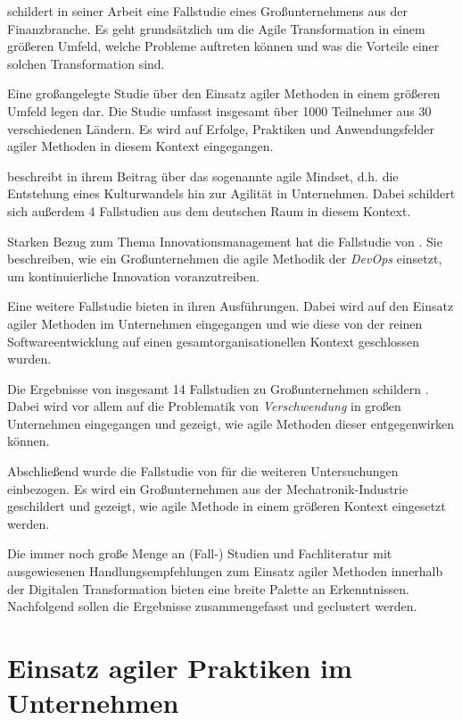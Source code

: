  schildert in seiner Arbeit eine Fallstudie eines Großunternehmens aus der Finanzbranche. Es geht grundsätzlich um die Agile Transformation in einem größeren Umfeld, welche Probleme auftreten können und was die Vorteile einer solchen Transformation sind.

Eine großangelegte Studie über den Einsatz agiler Methoden in einem größeren Umfeld legen  dar. Die Studie umfasst insgesamt über 1000 Teilnehmer aus 30 verschiedenen Ländern. Es wird auf Erfolge, Praktiken und Anwendungsfelder agiler Methoden in diesem Kontext eingegangen.

 beschreibt in ihrem Beitrag über das sogenannte agile Mindset, d.h. die Entstehung eines Kulturwandels hin zur Agilität in Unternehmen. Dabei schildert sich außerdem 4 Fallstudien aus dem deutschen Raum in diesem Kontext. 

Starken Bezug zum Thema Innovationsmanagement hat die Fallstudie von . Sie beschreiben, wie ein Großunternehmen die agile Methodik der \textit{DevOps} einsetzt, um kontinuierliche Innovation voranzutreiben.

Eine weitere Fallstudie bieten  in ihren Ausführungen. Dabei wird auf den Einsatz agiler Methoden im Unternehmen eingegangen und wie diese von der reinen Softwareentwicklung auf einen gesamtorganisationellen Kontext geschlossen wurden.

Die Ergebnisse von insgesamt 14 Fallstudien zu Großunternehmen schildern . Dabei wird vor allem auf die Problematik von \textit{Verschwendung} in großen Unternehmen eingegangen und gezeigt, wie agile Methoden dieser entgegenwirken können.

Abschließend wurde die Fallstudie von  für die weiteren Untersuchungen einbezogen. Es wird ein Großunternehmen aus der Mechatronik-Industrie geschildert und gezeigt, wie agile Methode in einem größeren Kontext eingesetzt werden. 

Die immer noch große Menge an (Fall-) Studien und Fachliteratur mit ausgewiesenen Handlungsempfehlungen zum Einsatz agiler Methoden innerhalb der Digitalen Transformation bieten eine breite Palette an Erkenntnissen. Nachfolgend sollen die Ergebnisse zusammengefasst und geclustert werden.

\section{Einsatz agiler Praktiken im Unternehmen}

